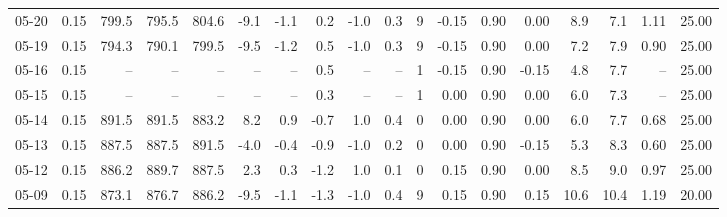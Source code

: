 \begin{threeparttable}
{\begin{tabular}{lrrrrrrrrrrrrrrrrr}
  05-20 &     0.15 & 799.5 & 795.5 & 804.6 &       -9.1 &           -1.1 &                       0.2 &                     -1.0 &                 0.3 &              9 &      -0.15 &      0.90 &           0.00 &              8.9 &                 7.1 &            1.11 &                  25.00 \\
  05-19 &     0.15 & 794.3 & 790.1 & 799.5 &       -9.5 &           -1.2 &                       0.5 &                     -1.0 &                 0.3 &              9 &      -0.15 &      0.90 &           0.00 &              7.2 &                 7.9 &            0.90 &                  25.00 \\
  05-16 &     0.15 &    -- &    -- &    -- &         -- &             -- &                       0.5 &                       -- &                  -- &              1 &      -0.15 &      0.90 &          -0.15 &              4.8 &                 7.7 &              -- &                  25.00 \\
  05-15 &     0.15 &    -- &    -- &    -- &         -- &             -- &                       0.3 &                       -- &                  -- &              1 &       0.00 &      0.90 &           0.00 &              6.0 &                 7.3 &              -- &                  25.00 \\
  05-14 &     0.15 & 891.5 & 891.5 & 883.2 &        8.2 &            0.9 &                      -0.7 &                      1.0 &                 0.4 &              0 &       0.00 &      0.90 &           0.00 &              6.0 &                 7.7 &            0.68 &                  25.00 \\
  05-13 &     0.15 & 887.5 & 887.5 & 891.5 &       -4.0 &           -0.4 &                      -0.9 &                     -1.0 &                 0.2 &              0 &       0.00 &      0.90 &          -0.15 &              5.3 &                 8.3 &            0.60 &                  25.00 \\
  05-12 &     0.15 & 886.2 & 889.7 & 887.5 &        2.3 &            0.3 &                      -1.2 &                      1.0 &                 0.1 &              0 &       0.15 &      0.90 &           0.00 &              8.5 &                 9.0 &            0.97 &                  25.00 \\
  05-09 &     0.15 & 873.1 & 876.7 & 886.2 &       -9.5 &           -1.1 &                      -1.3 &                     -1.0 &                 0.4 &              9 &       0.15 &      0.90 &           0.15 &             10.6 &                10.4 &            1.19 &                  20.00 \\

\end{tabular}}
\end{threeparttable}
